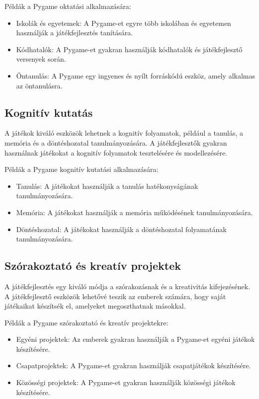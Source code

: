 Példák a Pygame oktatási alkalmazására:
\begin{itemize}
    
    \item Iskolák és egyetemek: A Pygame-et egyre több iskolában és egyetemen használják a játékfejlesztés tanítására.
    \item Kódhatalók: A Pygame-et gyakran használják kódhatalók és játékfejlesztő versenyek során.
    \item Öntanulás: A Pygame egy ingyenes és nyílt forráskódú eszköz, amely alkalmas az öntanulásra.
\end{itemize}

\subsection{Kognitív kutatás}
A játékok kiváló eszközök lehetnek a kognitív folyamatok, például a tanulás, a memória és a döntéshozatal tanulmányozására. A játékfejlesztők gyakran használnak játékokat a kognitív folyamatok tesztelésére és modellezésére.

Példák a Pygame kognitív kutatási alkalmazására:
\begin{itemize}
    
    \item Tanulás: A játékokat használják a tanulás hatékonyságának tanulmányozására.
    \item Memória: A játékokat használják a memória működésének tanulmányozására.
    \item Döntéshozatal: A játékokat használják a döntéshozatal folyamatának tanulmányozására.
\end{itemize}
\subsection{Szórakoztató és kreatív projektek}
A játékfejlesztés egy kiváló módja a szórakozásnak és a kreativitás kifejezésének. A játékfejlesztő eszközök lehetővé teszik az emberek számára, hogy saját játékaikat készítsék el, amelyeket megoszthatnak másokkal.

Példák a Pygame szórakoztató és kreatív projektekre:
\begin{itemize}
    
    \item Egyéni projektek: Az emberek gyakran használják a Pygame-et egyéni játékok készítésére.
    \item Csapatprojektek: A Pygame-et gyakran használják csapatjátékok készítésére.
    \item Közösségi projektek: A Pygame-et gyakran használják közösségi játékok készítésére.
\end{itemize}
